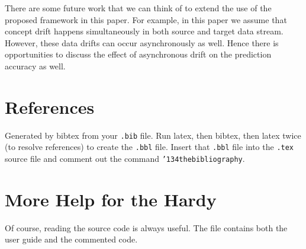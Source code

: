 There are some future work that we can think of to extend the use
of the proposed framework in this paper. For example, in this
paper we assume that concept drift happens
simultaneously in both source and target data stream. However,
these data drifts can occur asynchronously as well. Hence there
is opportunities to discuss the effect of asynchronous drift on the prediction accuracy as well.

\appendix

\section{References}
Generated by bibtex from your \texttt{.bib} file.  Run latex,
then bibtex, then latex twice (to resolve references)
to create the \texttt{.bbl} file.  Insert that \texttt{.bbl}
file into the \texttt{.tex} source file and comment out
the command \texttt{{\char'134}thebibliography}.
\section{More Help for the Hardy}

Of course, reading the source code is always useful.  The file
 contains both the user guide and the commented
code.




